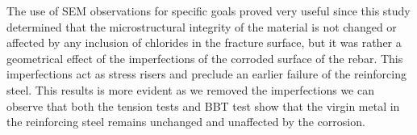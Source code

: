The use of SEM observations for specific goals proved very useful since this study determined that the microstructural integrity of the material is not changed or affected by any inclusion of chlorides in the fracture surface, but it was rather a geometrical effect of the imperfections of the corroded surface of the rebar. This imperfections act as stress risers and preclude an earlier failure of the reinforcing steel. This results is more evident as we removed the imperfections we can observe that both the tension tests and BBT test show that the virgin metal in the reinforcing steel remains unchanged and unaffected by the corrosion.
